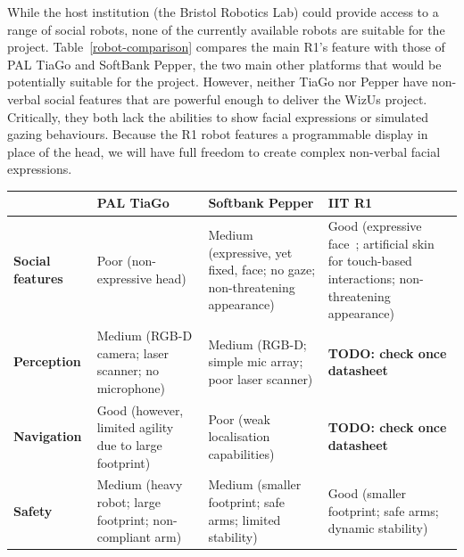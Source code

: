 \documentclass[11pt,a4paper]{report}
\newcommand{\project}{WizUs\xspace}
\newcommand{\TODO}[1]{{\color{red}\textbf{TODO: #1}}}
\begin{document}
While the host institution (the Bristol Robotics Lab) could provide access to a
range of social robots, none of the currently available robots are suitable for
the project.  Table~\ref{robot-comparison} compares the main R1's feature with
those of PAL TiaGo and SoftBank Pepper, the two main other platforms that would
be potentially suitable for the project. However, neither TiaGo nor Pepper have
non-verbal social features that are powerful enough to deliver the \project
project. Critically, they both lack the abilities to show facial expressions or
simulated gazing behaviours. Because the R1 robot features a programmable
display in place of the head, we will have full freedom to create complex
non-verbal facial expressions.

\begin{table}[]
    \begin{tabular}{@{}p{3cm}p{5cm}p{5cm}p{5cm}@{}}
\toprule
                                           & PAL TiaGo                                                & Softbank Pepper                                                           & \textbf{IIT R1}                                                                                                                              \\ \midrule
\textbf{Social features}                   & Poor (non-expressive head)                               & Medium (expressive, yet fixed, face; no gaze; non-threatening appearance) & Good (expressive face~\cite{lehman2016head}; artificial skin for touch-based interactions; non-threatening appearance) \\
\textbf{Perception}                        & Medium (RGB-D camera; laser scanner; no microphone)      & Medium (RGB-D; simple mic array; poor laser scanner)                      & \TODO{check once datasheet}                                                                                                   \\
\textbf{Navigation}                        & Good (however, limited agility due to large footprint)   & Poor (weak localisation capabilities)                                     & \TODO{check once datasheet}                                                                                                   \\
\textbf{Safety}                            & Medium (heavy robot; large footprint; non-compliant arm) & Medium (smaller footprint; safe arms; limited stability)                  & Good (smaller footprint; safe arms; dynamic stability)                                                                                       \\

\end{tabular}
\end{table}
\end{document}
